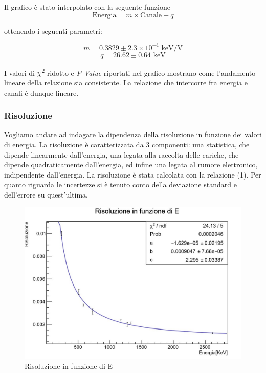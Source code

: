 \documentclass[a4paper,10pt]{article}
\newcommand*{\unit}[1]{\ensuremath{\mathrm{\,#1}}}
\begin{document}
Il grafico \`e stato interpolato con la seguente funzione 
\begin{equation}
	\textrm{Energia} = m \times \textrm{Canale} + q
\end{equation}

ottenendo i seguenti parametri:

$$
	m=0.3829 \pm 2.3 \times 10^{-4}\, \unit{keV/V} %
$$
$$
	q=26.62 \pm 0.64\, \unit{keV}
$$

\noindent I valori di $\chi$\textsuperscript{2} ridotto e \textit{P-Value} riportati nel grafico mostrano come l'andamento lineare della relazione sia consistente. La relazione che intercorre fra energia e canali \`e dunque lineare.


\subsubsection{Risoluzione}
Vogliamo andare ad indagare la dipendenza della risoluzione in funzione dei valori di energia. La risoluzione \`e caratterizzata da 3 componenti: una statistica, che dipende linearmente dall'energia, una legata alla raccolta delle cariche, che dipende quadraticamente dall'energia, ed infine una legata al rumore elettronico, indipendente dall'energia. La risoluzione \`e stata calcolata con la relazione (1). Per quanto riguarda le incertezze si \`e tenuto conto della deviazione standard e dell'errore su quest'ultima. 

\begin{figure}[H]
    \centering
    \includegraphics[scale=0.6]{grafici/risoluzionesources}
    \caption{Risoluzione in funzione di E}
\end{figure}
\end{document}
